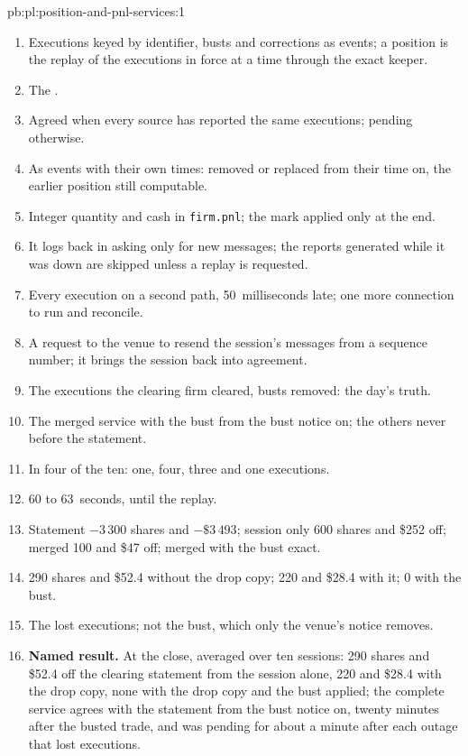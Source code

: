 \begin{solution}{pb:pl:position-and-pnl-services:1}
\begin{enumerate}
\item Executions keyed by identifier, busts and corrections as events; a position is the replay of the executions in force at a time through
the exact keeper.
\item The .
\item Agreed when every source has reported the same executions; pending otherwise.
\item As events with their own times: removed or replaced from their time on, the earlier position still computable.
\item Integer quantity and cash in \texttt{firm.pnl}; the mark applied only at the end.
\item It logs back in asking only for new messages; the reports generated while it was down are skipped unless a replay is requested.
\item Every execution on a second path, 50~milliseconds late; one more connection to run and reconcile.
\item A request to the venue to resend the session's messages from a sequence number; it brings the session back into agreement.
\item The executions the clearing firm cleared, busts removed: the day's truth.
\item The merged service with the bust from the bust notice on; the others never before the statement.
\item In four of the ten: one, four, three and one executions.
\item 60 to 63~seconds, until the replay.
\item Statement $-3\,300$ shares and $-\$3\,493$; session only 600 shares and \$252 off; merged 100 and \$47 off; merged with the bust exact.
\item 290 shares and \$52.4 without the drop copy; 220 and \$28.4 with it; 0 with the bust.
\item The lost executions; not the bust, which only the venue's notice removes.
\item \textbf{Named result.} At the close, averaged over ten sessions: 290 shares and \$52.4 off the clearing statement from the session alone,
220 and \$28.4 with the drop copy, none with the drop copy and the bust applied; the complete service agrees with the statement from the bust
notice on, twenty minutes after the busted trade, and was pending for about a minute after each outage that lost executions.

\end{enumerate}
\end{solution}
